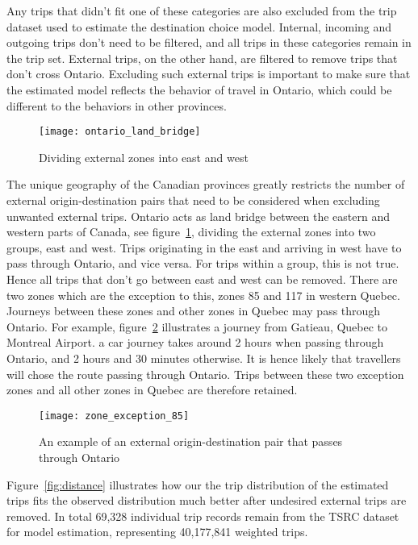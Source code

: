 Any trips that didn't fit one of these categories are also excluded from the trip dataset used to estimate the destination choice model. Internal, incoming and outgoing trips don't need to be filtered, and all trips in these categories remain in the trip set. External trips, on the other hand, are filtered to remove trips that don't cross Ontario. Excluding such external trips is important to make sure that the estimated model reflects the behavior of travel in Ontario, which could be different to the behaviors in other provinces. 

\begin{figure}[H]
\centering
\texttt{[image: ontario\_land\_bridge]}
\caption{Dividing external zones into east and west}
\label{fig:bridge}
\end{figure}

The unique geography of the Canadian provinces greatly restricts the number of external origin-destination pairs that need to be considered when excluding unwanted external trips. Ontario acts as land bridge between the eastern and western parts of Canada, see figure~\ref{fig:bridge}, dividing the external zones into two groups, east and west. Trips originating in the east and arriving in west have to pass through Ontario, and vice versa. For trips within a group, this is not true. Hence all trips that don't go between east and west can be removed. There are two zones which are the exception to this, zones 85 and 117 in western Quebec. Journeys between these zones and other zones in Quebec may pass through Ontario. For example, figure~\ref{fig:exception85} illustrates a journey from Gatieau, Quebec to Montreal Airport. a car journey takes around 2 hours when passing through Ontario, and 2 hours and 30 minutes otherwise. It is hence likely that travellers will chose the route passing through Ontario. Trips between these two exception zones and all other zones in Quebec are therefore retained. 

\begin{figure}[H]
\centering
\texttt{[image: zone\_exception\_85]}
\caption{An example of an external origin-destination pair that passes through Ontario}
\label{fig:exception85}
\end{figure}


Figure~\ref{fig:distance} illustrates how our the trip distribution of the estimated trips fits the observed distribution much better after undesired external trips are removed. In total 69,328 individual trip records remain from the TSRC dataset for model estimation, representing 40,177,841 weighted trips.

